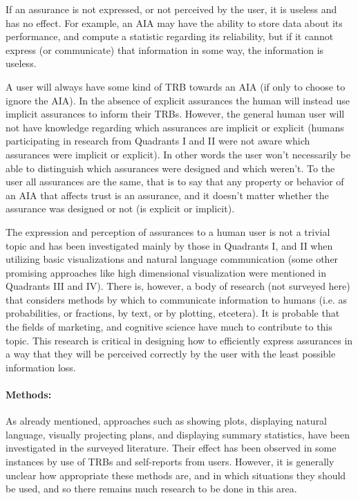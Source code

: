     If an assurance is not expressed, or not perceived by the user, it is useless and has no effect. For example, an AIA may have the ability to store data about its performance, and compute a statistic regarding its reliability, but if it cannot express (or communicate) that information in some way, the information is useless.

    A user will always have some kind of TRB towards an AIA (if only to choose to ignore the AIA). In the absence of explicit assurances the human will instead use implicit assurances to inform their TRBs. However, the general human user will not have knowledge regarding which assurances are implicit or explicit (humans participating in research from Quadrants I and II were not aware which assurances were implicit or explicit). In other words the user won't necessarily be able to distinguish which assurances were designed and which weren't. To the user all assurances are the same, that is to say that any property or behavior of an AIA that affects trust is an assurance, and it doesn't matter whether the assurance was designed or not (is explicit or implicit).
    
    The expression and perception of assurances to a human user is not a trivial topic and has been investigated mainly by those in Quadrants I, and II  when utilizing basic visualizations and natural language communication (some other promising approaches like high dimensional visualization were mentioned in Quadrants III and IV). There is, however, a body of research (not surveyed here) that considers methods by which to communicate information to humans (i.e. as probabilities, or fractions, by text, or by plotting, etcetera). It is probable that the fields of marketing, and cognitive science have much to contribute to this topic. This research is critical in designing how to efficiently express assurances in a way that they will be perceived correctly by the user with the least possible information loss.

    \paragraph{Methods:} As already mentioned, approaches such as showing plots, displaying natural language, visually projecting plans, and displaying summary statistics, have been investigated in the surveyed literature. Their effect has been observed in some instances by use of TRBs and self-reports from users. However, it is generally unclear how appropriate these methods are, and in which situations they should be used, and so there remains much research to be done in this area.

